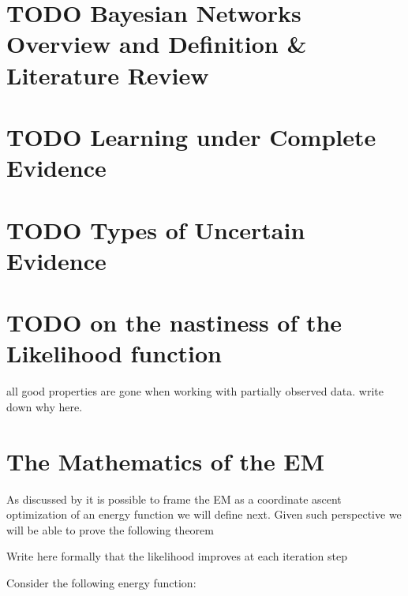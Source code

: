 \documentclass[11pt]{article}
\begin{document}
\begin{article}

\maketitle

\newpage

\tableofcontents

\newpage

\section{{\bfseries\sffamily TODO} Bayesian Networks Overview and Definition \& Literature Review}
\label{sec:org289143d}

\section{{\bfseries\sffamily TODO} Learning under Complete Evidence}
\label{sec:orgde961a1}

\section{{\bfseries\sffamily TODO} Types of Uncertain Evidence}
\label{sec:org47b2909}

\section{{\bfseries\sffamily TODO} on the nastiness of the Likelihood function}
\label{sec:orgef515e9}

all good properties are gone when working with partially observed
data. write down why here. 


\section{The Mathematics of the EM}
\label{sec:orgf541545}
As discussed by \cite{koller2009probabilistic} it is possible to frame
the EM as a coordinate ascent optimization of an energy function we
will define next. Given such perspective we will be able to prove the
following theorem

\begin{theorem}\label{thm:one}
Write here formally that the likelihood improves at each iteration step
\end{theorem}

Consider the following energy function:


\end{article}
\end{document}
